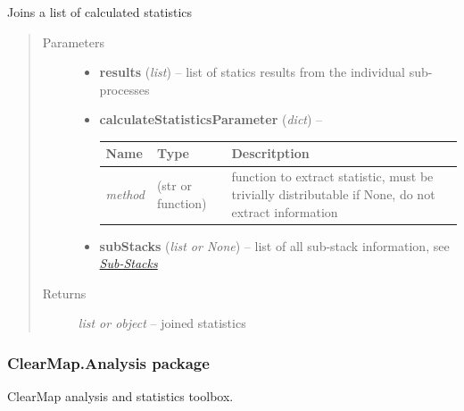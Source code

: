 \documentclass[letterpaper,10pt,english]{sphinxmanual}
\begin{document}

\begin{fulllineitems}
\label{api/ClearMap.ImageProcessing:ClearMap.ImageProcessing.ImageStatistics.joinStatistics}
Joins a list of calculated statistics
\begin{quote}\begin{description}
\item[{Parameters}] \leavevmode\begin{itemize}
\item {} 
\textbf{results} (\emph{list}) --
list of statics results from the individual sub-processes

\item {} 
\textbf{calculateStatisticsParameter} (\emph{dict}) --

\begin{tabulary}{\linewidth}{|L|L|L|}
\hline
\textsf{\relax 
Name
} & \textsf{\relax 
Type
} & \textsf{\relax 
Descritption
}\\
\hline
\emph{method}
 & 
(str or function)
 & 
function to extract statistic, must be trivially distributable
if None, do not extract information
\\
\hline\end{tabulary}


\item {} 
\textbf{subStacks} (\emph{list or None}) --
list of all sub-stack information, see {\hyperref[api/ClearMap.ImageProcessing:substack]{\emph{Sub-Stacks}}}

\end{itemize}

\item[{Returns}] \leavevmode
\emph{list or object} --
joined statistics

\end{description}\end{quote}

\end{fulllineitems}



\subsubsection{ClearMap.Analysis package}
\label{api/ClearMap.Analysis:clearmap-analysis-package}\label{api/ClearMap.Analysis::doc}\label{api/ClearMap.Analysis:module-ClearMap.Analysis}
ClearMap analysis and statistics toolbox.
\end{document}
